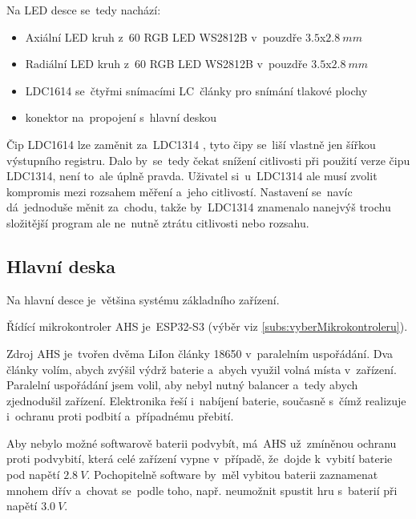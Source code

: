 Na LED desce se~tedy nachází:
\begin{itemize}
    \item Axiální LED kruh z~60 RGB LED WS2812B v~pouzdře \(3.5\)\;x\;\(2.8~mm\)
    \item Radiální LED kruh z~60 RGB LED WS2812B v~pouzdře \(3.5\)\;x\;\(2.8~mm\)
    \item LDC1614 se~čtyřmi snímacími LC~články pro snímání tlakové plochy 
    \item konektor na~propojení s~hlavní deskou
\end{itemize}

Čip LDC1614 \cite{LDC1614} lze zaměnit za~LDC1314 \cite{LDC1314}, tyto čipy se~liší vlastně jen šířkou výstupního registru.
Dalo by~se~tedy čekat snížení citlivosti při použití verze čipu LDC1314, není to~ale úplně pravda.
Uživatel si~u~LDC1314 ale musí zvolit kompromis mezi rozsahem měření a~jeho citlivostí.
Nastavení se~navíc dá~jednoduše měnit za~chodu, takže by~LDC1314 znamenalo nanejvýš trochu složitější program ale ne~nutně ztrátu citlivosti nebo rozsahu. 


\subsection{Hlavní deska}
Na hlavní desce je~většina systému základního zařízení.

Řídící mikrokontroler AHS je~ESP32-S3 (výběr viz \ref{subs:vyberMikrokontroleru}).

Zdroj AHS je~tvořen dvěma LiIon články 18650 v~paralelním uspořádání.
Dva články volím, abych zvýšil výdrž baterie a~abych využil volná místa v~zařízení.
Paralelní uspořádání jsem volil, aby nebyl nutný balancer a~tedy abych zjednodušil zařízení.
Elektronika řeší i~nabíjení baterie, současně s~čímž realizuje i~ochranu proti podbití a~případnému přebití.

Aby nebylo možné softwarově baterii podvybít, má~AHS už~zmíněnou ochranu proti podvybití, která celé zařízení vypne v~případě, že~dojde k~vybití baterie pod napětí \(2.8~V\).
Pochopitelně software by~měl vybitou baterii zaznamenat mnohem dřív a~chovat se~podle toho, např. neumožnit spustit hru s~baterií při napětí \(3.0~V\).

